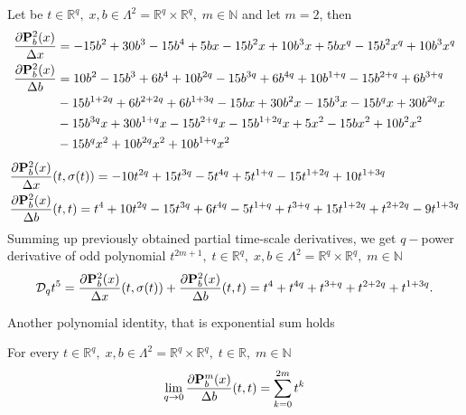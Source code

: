 \begin{examp}
    Let be $t\in {\mathbb{R}}^{q}, \; x,b\in\Lambda^2 = {\mathbb{R}}^{q} \times {\mathbb{R}}^{q}, \; m\in\mathbb{N}$ and let $m=2$, then
    \begin{align*}
        \frac{\partial {\mathbf{P}}\sp{2} \sb{b}(x)}{\Delta x}
        &= -15 b^2 + 30 b^3 - 15 b^4 + 5 b x - 15 b^2 x + 10 b^3 x + 5 b x^q - 15 b^2 x^q + 10 b^3 x^q \\
        \frac{\partial {\mathbf{P}}\sp{2} \sb{b}(x)}{\Delta b}
        &= 10 b^2 - 15 b^3 + 6 b^4 + 10 b^{2 q} - 15 b^{3 q} + 6 b^{4 q}
        + 10 b^{1 + q} - 15 b^{2 + q} + 6 b^{3 + q} \\
        &- 15 b^{1 + 2 q} + 6 b^{2 + 2 q} + 6 b^{1 + 3 q} - 15 b x + 30 b^2 x - 15 b^3 x
        - 15 b^q x + 30 b^{2 q} x \\
        &- 15 b^{3 q} x + 30 b^{1 + q} x - 15 b^{2 + q} x - 15 b^{1 + 2 q} x + 5 x^2 - 15 b x^2 + 10 b^2 x^2 \\
        &- 15 b^q x^2 + 10 b^{2 q} x^2 + 10 b^{1 + q} x^2
    \end{align*}
    \begin{align*}
        &\frac{\partial {\mathbf{P}}\sp{2} \sb{b}(x)}{\Delta x}(t, \sigma(t))
        = -10 t^{2 q} + 15 t^{3q} - 5 t^{4q} + 5 t^{1+q} - 15 t^{1+2q} + 10 t^{1 + 3 q} \\
        &\frac{\partial {\mathbf{P}}\sp{2} \sb{b}(x)}{\Delta b}(t, t)
        = t^4 + 10 t^{2 q} - 15 t^{3 q} + 6 t^{4 q} - 5 t^{1 + q} + t^{3 + q}
        + 15 t^{1 + 2 q} + t^{2 + 2 q} - 9 t^{1 + 3 q}
    \end{align*}
    Summing up previously obtained partial time-scale derivatives, we get $q-$power derivative of odd polynomial
    $t^{2m+1}, \; t\in {\mathbb{R}}^{q}, \; x,b\in\Lambda^2 = {\mathbb{R}}^{q} \times {\mathbb{R}}^{q}, \; m\in\mathbb{N}$
    \[
        \mathcal{D}_q t^{5}
        = \frac{\partial {\mathbf{P}}\sp{2} \sb{b}(x)}{\Delta x}(t, \sigma(t)) + \frac{\partial {\mathbf{P}}\sp{2} \sb{b}(x)}{\Delta b}(t, t)
        = t^4 + t^{4 q} + t^{3 + q} + t^{2 + 2 q} + t^{1 + 3 q}.
    \]
\end{examp}
Another polynomial identity, that is exponential sum holds
\begin{cor}
    For every $t\in {\mathbb{R}}^{q}, \; x,b\in\Lambda^2 = {\mathbb{R}}^{q} \times {\mathbb{R}}^{q}, \; t\in\mathbb{R}, \; m\in\mathbb{N}$
    \[
        \lim \limits_{q \to 0} \frac{\partial {\mathbf{P}}\sp{m} \sb{b}(x)}{\Delta b}(t,t) = \sum_{k=0}^{2m} t^k
    \]
\end{cor}